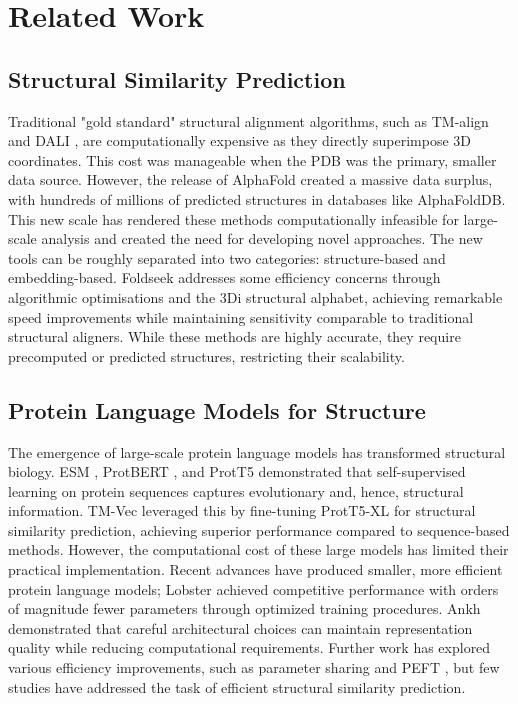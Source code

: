 \documentclass[runningheads]{llncs}
\begin{document}
\section{Related Work}


\subsection{Structural Similarity Prediction}

Traditional "gold standard" structural alignment algorithms, such as TM-align \cite{zhang2005tm} and DALI \cite{holm1995dali}, are computationally expensive as they directly superimpose 3D coordinates. This cost was manageable when the PDB was the primary, smaller data source.
However, the release of AlphaFold \cite{jumper2021highly} created a massive data surplus, with hundreds of millions of predicted structures in databases like AlphaFoldDB. This new scale has rendered these methods computationally infeasible for large-scale analysis and created the need for developing novel approaches.
The new tools can be roughly separated into two categories: structure-based and embedding-based. Foldseek \cite{van2024fast} addresses some efficiency concerns through algorithmic optimisations and the 3Di structural alphabet, achieving remarkable speed improvements while maintaining sensitivity comparable to traditional structural aligners. While these methods are highly accurate, they require precomputed or predicted structures, restricting their scalability. 

\subsection{Protein Language Models for Structure}

The emergence of large-scale protein language models has transformed structural biology. ESM \cite{rives2021biological}, ProtBERT \cite{elnaggar2021prottranscrackinglanguagelifes}, and ProtT5 \cite{elnaggar2021prottranscrackinglanguagelifes} demonstrated that self-supervised learning on protein sequences captures evolutionary and, hence, structural information. TM-Vec leveraged this by fine-tuning ProtT5-XL for structural similarity prediction, achieving superior performance compared to sequence-based methods. However, the computational cost of these large models has limited their practical implementation. Recent advances have produced smaller, more efficient protein language models; Lobster \cite{frey2024cramming} achieved competitive performance with orders of magnitude fewer parameters through optimized training procedures. Ankh \cite{elnaggar2023ankh} demonstrated that careful architectural choices can maintain representation quality while reducing computational requirements. Further work has explored various efficiency improvements, such as parameter sharing \cite{sachan2018parameter} and PEFT \cite{sledzieski2024democratizing}, but few studies have addressed the task of efficient structural similarity prediction.
\end{document}
